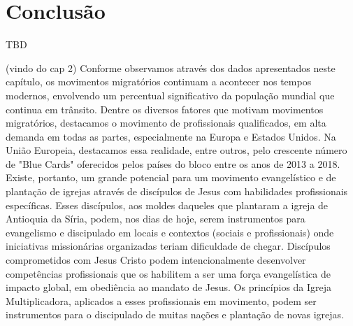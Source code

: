 \documentclass[12pt]{abntex2}
\begin{document}
\chapter{Conclusão}

TBD

(vindo do cap 2)
Conforme observamos através dos dados apresentados neste capítulo, os movimentos migratórios continuam a acontecer nos tempos modernos, envolvendo um percentual significativo da população mundial que continua em trânsito. Dentre os diversos fatores que motivam movimentos migratórios, destacamos o movimento de profissionais qualificados, em alta demanda em todas as partes, especialmente na Europa e Estados Unidos. Na União Europeia, destacamos essa realidade, entre outros, pelo crescente número de "Blue Cards" oferecidos pelos países do bloco entre os anos de 2013 a 2018. Existe, portanto, um grande potencial para um movimento evangelístico e de plantação de igrejas através de discípulos de Jesus com habilidades profissionais específicas. Esses discípulos, aos moldes daqueles que plantaram a igreja de Antioquia da Síria, podem, nos dias de hoje, serem instrumentos para evangelismo e discipulado em locais e contextos (sociais e profissionais) onde iniciativas missionárias organizadas teriam dificuldade de chegar. Discípulos comprometidos com Jesus Cristo podem intencionalmente desenvolver competências profissionais que os habilitem a ser uma força evangelística de impacto global, em obediência ao mandato de Jesus. Os princípios da Igreja Multiplicadora, aplicados a esses profissionais em movimento, podem ser instrumentos para o discipulado de muitas nações e plantação de novas igrejas.



\end{document}
